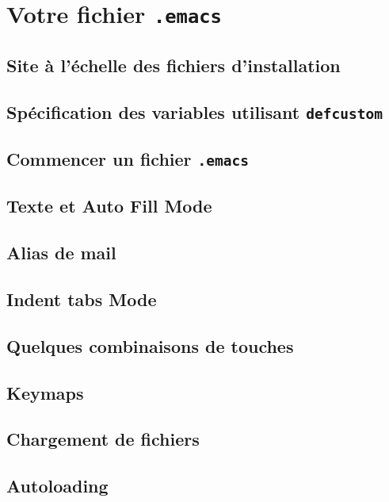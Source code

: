 \chapter{Votre fichier \texttt{.emacs}}

\section{Site à l'échelle des fichiers d'installation}

\section{Spécification des variables utilisant
  \texttt{defcustom}}

\section{Commencer un fichier \texttt{.emacs}}

\section{Texte et Auto Fill Mode}

\section{Alias de mail}

\section{Indent tabs Mode}

\section{Quelques combinaisons de touches}

\section{Keymaps}

\section{Chargement de fichiers}

\section{Autoloading}

